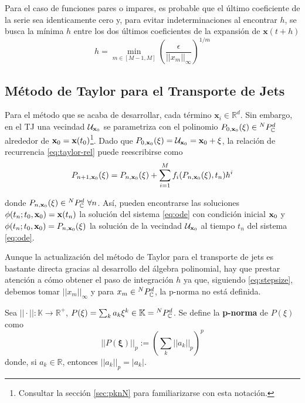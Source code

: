 Para el caso de funciones pares o impares, es probable que el último coeficiente de la serie sea identicamente cero y, para evitar indeterminaciones al encontrar $h$, se busca la mínima $h$ entre los dos últimos coeficientes de la expansión de $\mathbf{x}(t+h)$
\begin{equation}
h = \min_{m \in [M-1,M]}{ \left( \frac{\epsilon}{||x_m||_\infty} \right)^{1/m} }
\label{eq:stepsize}
\end{equation} 

\subsection{Método de Taylor para el Transporte de Jets}
Para el método que se acaba de desarrollar, cada término $\mathbf{x}_i \in \mathbb{R}^d$. Sin embargo, en el TJ una vecindad $\mathcal{U}_{\mathbf{x}_0}$ se parametriza con el polinomio $P_{0,\mathbf{x}_0}(\mathbf{\xi}) \in {^{N}P_{\mathbb{C}}^ d }$ alrededor de $\mathbf{x}_0 = \mathbf{x}(t_0)$\footnote{Consultar la sección \ref{sec:pknN} para familiarizarse con esta notación.}. Dado que $P_{0,\mathbf{x}_0}(\mathbf{\xi}) = \mathcal{U}_{\mathbf{x}_0} = \mathbf{x}_0 + \mathbf{\xi}$, la relación de recurrencia \ref{eq:taylor-rel} puede reescribirse como
\begin{equation}
P_{n+1,\mathbf{x}_0}(\xi) = P_{n,\mathbf{x}_0}(\xi) + \sum_{i=1}^M f_i(P_{n,\mathbf{x}_0}(\xi),t_n)h^i 
\label{eq:jt-rel}
\end{equation}

donde $P_{n,\xo}(\xi) \in \pkk{N}{d} \ \forall n$. Así, pueden encontrarse las soluciones $\phi(t_n;t_0,\mathbf{x}_0) = \mathbf{x}(t_n)$ la solución del sistema \ref{eq:ode} con condición inicial $\mathbf{x}_0$ y $\phi(t_n;t_0,\mathbf{x}_0) = P_{n,\mathbf{x}_0}(\xi)$ la solución de la vecindad $\mathcal{U}_{\mathbf{x}_0}$ al tiempo
$t_n$ del sistema \ref{eq:ode}.

Aunque la actualización del método de Taylor para el transporte de jets es bastante directa gracias al desarrollo del álgebra polinomial, hay que prestar atención a cómo obtener el paso de integración $h$ ya que, siguiendo \ref{eq:stepsize}, debemos tomar $||x_m||_\infty$ y para $x_m \in {^{N}P_{\mathbb{C}}^ d }$, la p-norma no está definida.

\begin{definicion}
Sea $||\cdot|| : \mathbb{K} \to \mathbb{R}^+$, $P(\mathbf{\xi}) = \sum_{k} a_k \mathbf{\xi}^k \in \mathbb{K} = {^{N}P_{\mathbb{C}}^ d }$. Se define la \textbf{p-norma} de $P(\xi)$ como
\begin{equation}
 ||P(\mathbf{\xi})||_p := \left( \sum_{k} ||a_k||_p \right)^p
 \label{eq:poly-norm}
\end{equation}  
donde, si $a_k \in \mathbb{R}$, entonces $||a_k||_p = |a_k|$.
\end{definicion}

